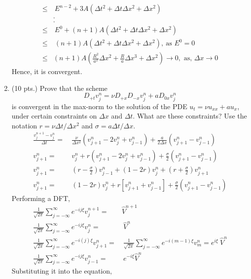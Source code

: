 \documentclass[11pt]{article}
\newcommand{\Dpt}{D_{+t}}
\newcommand{\Dpx}{D_{+x}}
\newcommand{\Dmx}{D_{-x}}
\newcommand{\Dzx}{D_{0x}}
\newcommand{\dx}{\Delta x}
\newcommand{\dt}{\Delta t}
\newcommand{\vnj}{v^{n}_j}
\newcommand{\vnpj}{v^{n+1}_j}
\newcommand{\vnjp}{v^{n}_{j+1}}
\newcommand{\vnjm}{v^{n}_{j-1}}
\begin{document}
\begin{enumerate}
\begin{align*}
    \leq & \ E^{n-2} + 3A\left(\dt^2 + \dt \dx^2 + \dx^2\right) \\
    & . \\
    & . \\
    \leq & \ E^0 + \left(n+1\right)A\left(\dt^2 + \dt \dx^2 + \dx^2\right) \\
    \leq & \ \left(n+1\right)A\left(\dt^2 + \dt \dx^2 + \dx^2\right), \ \text{as }E^0  = 0 \\
    \leq & \left(n+1\right)A\left(\frac{R^2}{a^2}\dx^2 + \frac{R}{a} \dx^3 + \dx^2\right) \rightarrow 0, \text{ as, }\dx \rightarrow 0
    \end{align*}
    Hence, it is convergent.
  \item (10 pts.) {\color{red}Prove that the scheme}
    \[
      \Dpt v_j^n = \nu\Dpx\Dmx v_j^n+a\Dzx v_j^n
    \]
    {\color{red}is convergent in the max-norm to the solution of the PDE }$u_t= \nu u_{xx}+au_x${\color{red}, under certain constraints on }$\dx$ and $\dt${\color{red}. What are these constraints? Use the notation }$r=\nu\dt/\dx^2$ {\color{red}and} $\sigma=a\dt/\dx$.
    \begin{align*}
    \frac{\vnpj - \vnj}{\dt} = & \ \frac{\nu}{\dx^2}\left(\vnjp -2\vnj + \vnjm\right) + \frac{a}{2\dx}\left(\vnjp - \vnjm\right) \\
    \vnjp = & \ \vnj + r\left(\vnjp -2\vnj + \vnjm\right) + \frac{\sigma}{2}\left(\vnjp - \vnjm\right)\\
    \vnjp = & \ \left(r-\frac{\sigma}{2}\right)\vnjm + \left(1-2r\right)\vnj + \left(r+\frac{\sigma}{2}\right)\vnjp \\
    \vnjp = & \ \left(1-2r\right)\vnj + r\left[\vnjp + \vnjm\right] + \frac{\sigma}{2}\left(\vnjp - \vnjm\right) 
    \end{align*}
    Performing a DFT, 
    \begin{align*}
    \frac{1}{\sqrt{2\pi}}\sum_{j=-\infty}^{\infty} e^{-ij\xi}\vnpj = & \hat{V}^{n+1}\\
    \frac{1}{\sqrt{2\pi}}\sum_{j=-\infty}^{\infty} e^{-ij\xi}\vnj = & \  \hat{V}^{n} \\ 
    \frac{1}{\sqrt{2\pi}}\sum_{j=-\infty}^{\infty} e^{-i(j)\xi}\vnjp = & \ \frac{1}{\sqrt{2\pi}}\sum_{j=-\infty}^{\infty} e^{-i(m-1)\xi}v^n_m = e^{i\xi} \ \hat{V}^n \\
    \frac{1}{\sqrt{2\pi}}\sum_{j=-\infty}^{\infty} e^{-ij\xi}\vnjm =& \  e^{-i\xi}\hat{V}^n
    \end{align*}
    Substituting it into the equation,
    \begin{align*}

\end{align*}
\end{enumerate}
\end{document}
